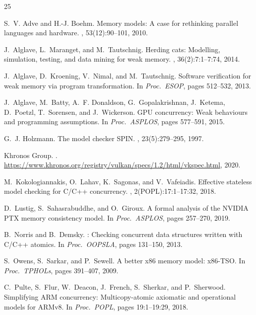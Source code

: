 \documentclass[10pt]{article}
\begin{document}
\begin{thebibliography}{25}

S.~V. Adve and H.-J. Boehm.
\newblock Memory models: A case for rethinking parallel languages and hardware.
, 53(12):90--101, 2010.

J.~Alglave, L.~Maranget, and M.~Tautschnig.
\newblock Herding cats: Modelling, simulation, testing, and data mining for weak memory.
, 36(2):7:1--7:74, 2014.

J.~Alglave, D.~Kroening, V.~Nimal, and M.~Tautschnig.
\newblock Software verification for weak memory via program transformation.
\newblock In {\em Proc.\ ESOP}, pages 512--532, 2013.

J.~Alglave, M.~Batty, A.~F. Donaldson, G.~Gopalakrishnan, J.~Ketema,
D.~Poetzl, T.~Sorensen, and J.~Wickerson.
\newblock GPU concurrency: Weak behaviours and programming assumptions.
\newblock In {\em Proc.\ ASPLOS}, pages 577--591, 2015.

G.~J. Holzmann.
\newblock The model checker {SPIN}.
, 23(5):279--295, 1997.

{Khronos Group}.
.
\newblock \url{https://www.khronos.org/registry/vulkan/specs/1.2/html/vkspec.html}, 2020.

M.~Kokologiannakis, O.~Lahav, K.~Sagonas, and V.~Vafeiadis.
\newblock Effective stateless model checking for {C/C++} concurrency.
, 2(POPL):17:1--17:32, 2018.

D.~Lustig, S.~Sahasrabuddhe, and O.~Giroux.
\newblock A formal analysis of the {NVIDIA PTX} memory consistency model.
\newblock In {\em Proc.\ ASPLOS}, pages 257--270, 2019.

B.~Norris and B.~Demsky.
: Checking concurrent data structures written with
  {C/C++} atomics.
\newblock In {\em Proc.\ OOPSLA}, pages 131--150, 2013.

S.~Owens, S.~Sarkar, and P.~Sewell.
\newblock A better x86 memory model: x86-{TSO}.
\newblock In {\em Proc.\ TPHOLs}, pages 391--407, 2009.

C.~Pulte, S.~Flur, W.~Deacon, J.~French, S.~Sherkar, and P.~Sherwood.
\newblock Simplifying {ARM} concurrency: Multicopy-atomic axiomatic and
  operational models for {ARMv8}.
\newblock In {\em Proc.\ POPL}, pages 19:1--19:29, 2018.


\end{thebibliography}
\end{document}
